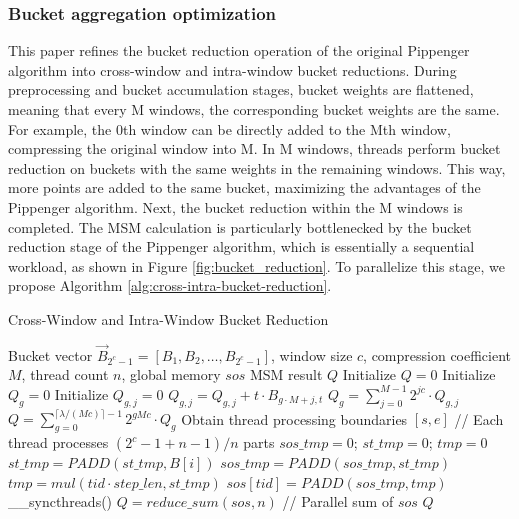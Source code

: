\documentclass[conference]{IEEEtran}
\begin{document}
\subsubsection{\textbf{Bucket aggregation optimization}}
This paper refines the bucket reduction operation of the original Pippenger algorithm into cross-window and intra-window bucket reductions. During preprocessing and bucket accumulation stages, bucket weights are flattened, meaning that every M windows, the corresponding bucket weights are the same. For example, the 0th window can be directly added to the Mth window, compressing the original window into M. In M windows, threads perform bucket reduction on buckets with the same weights in the remaining windows. This way, more points are added to the same bucket, maximizing the advantages of the Pippenger algorithm. Next, the bucket reduction within the M windows is completed. The MSM calculation is particularly bottlenecked by the bucket reduction stage of the Pippenger algorithm, which is essentially a sequential workload, as shown in Figure \ref{fig:bucket_reduction}. To parallelize this stage, we propose Algorithm \ref{alg:cross-intra-bucket-reduction}.

\begin{algorithm}
    \caption{Cross-Window and Intra-Window Bucket Reduction}
    \label{alg:cross-intra-bucket-reduction}
    \begin{algorithmic}[1]
    \REQUIRE Bucket vector $\vec{B}_{2^c - 1} = [B_1, B_2, \ldots, B_{2^c - 1}]$, window size $c$, compression coefficient $M$, thread count $n$, global memory $sos$
    \ENSURE MSM result $Q$
    \STATE Initialize $Q = 0$
        \STATE Initialize $Q_g = 0$
            \STATE Initialize $Q_{g,j} = 0$
                \STATE $Q_{g,j} = Q_{g,j} + t \cdot B_{g \cdot M + j, t}$
            \ENDFOR
        \ENDFOR
        \STATE $Q_g = \sum_{j=0}^{M-1} 2^{jc} \cdot Q_{g,j}$
    \ENDFOR
    \STATE $Q = \sum_{g=0}^{\lceil \lambda / (Mc) \rceil - 1} 2^{gMc} \cdot Q_g$
    \STATE Obtain thread processing boundaries $[s, e]$ \quad // Each thread processes $(2^c - 1 + n - 1) / n$ parts
    \STATE $sos\_tmp = 0$; $st\_tmp = 0$; $tmp = 0$
        \STATE $st\_tmp = PADD(st\_tmp, B[i])$
        \STATE $sos\_tmp = PADD(sos\_tmp, st\_tmp)$
        \STATE $tmp = mul(tid \cdot step\_len, st\_tmp)$
        \STATE $sos[tid] = PADD(sos\_tmp, tmp)$
    \ENDFOR
    \STATE \_\_syncthreads()
    \STATE $Q = reduce\_sum(sos, n)$ \quad // Parallel sum of $sos$
    \RETURN $Q$
    \end{algorithmic}
\end{algorithm}
\end{document}
